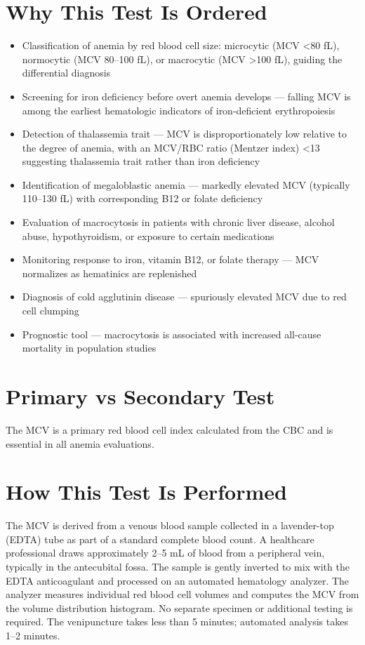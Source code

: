 \section*{Why This Test Is Ordered}
\begin{itemize}
  \item Classification of anemia by red blood cell size: microcytic (MCV <80 fL), normocytic (MCV 80--100 fL), or macrocytic (MCV >100 fL), guiding the differential diagnosis
  \item Screening for iron deficiency before overt anemia develops --- falling MCV is among the earliest hematologic indicators of iron-deficient erythropoiesis
  \item Detection of thalassemia trait --- MCV is disproportionately low relative to the degree of anemia, with an MCV/RBC ratio (Mentzer index) <13 suggesting thalassemia trait rather than iron deficiency
  \item Identification of megaloblastic anemia --- markedly elevated MCV (typically 110--130 fL) with corresponding B12 or folate deficiency
  \item Evaluation of macrocytosis in patients with chronic liver disease, alcohol abuse, hypothyroidism, or exposure to certain medications
  \item Monitoring response to iron, vitamin B12, or folate therapy --- MCV normalizes as hematinics are replenished
  \item Diagnosis of cold agglutinin disease --- spuriously elevated MCV due to red cell clumping
  \item Prognostic tool --- macrocytosis is associated with increased all-cause mortality in population studies
\end{itemize}

\section*{Primary vs Secondary Test}
The MCV is a primary red blood cell index calculated from the CBC and is essential in all anemia evaluations.

\section*{How This Test Is Performed}
The MCV is derived from a venous blood sample collected in a lavender-top (EDTA) tube as part of a standard complete blood count. A healthcare professional draws approximately 2--5 mL of blood from a peripheral vein, typically in the antecubital fossa. The sample is gently inverted to mix with the EDTA anticoagulant and processed on an automated hematology analyzer. The analyzer measures individual red blood cell volumes and computes the MCV from the volume distribution histogram. No separate specimen or additional testing is required. The venipuncture takes less than 5 minutes; automated analysis takes 1--2 minutes.

